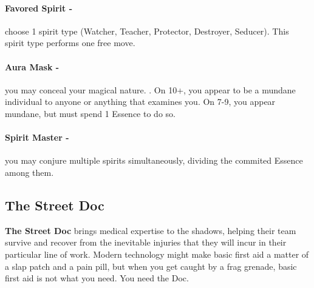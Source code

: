 \paragraph{Favored Spirit -} choose 1 spirit type (Watcher, Teacher, Protector, Destroyer, Seducer). This spirit type performs one free move.

\paragraph{Aura Mask -} you may conceal your magical nature. . On 10+, you appear to be a mundane individual to anyone or anything that examines you. On 7-9, you appear mundane, but must spend 1 Essence to do so.

\paragraph{Spirit Master -} you may conjure multiple spirits simultaneously, dividing the commited Essence among them.



\clearpage
\subsection{The Street Doc}
\textbf{The Street Doc} brings medical expertise to the shadows, helping their team survive and recover from the inevitable injuries that they will incur in their particular line of work. Modern technology might make basic first aid a matter of a slap patch and a pain pill, but when you get caught by a frag grenade, basic first aid is not what you need. You need the Doc.


